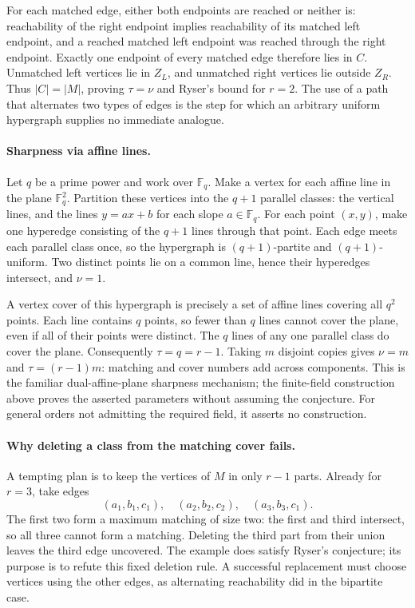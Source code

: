 \documentclass[11pt,a4paper]{article}
\begin{document}
For each matched edge, either both endpoints are reached or neither
is: reachability of the right endpoint implies reachability of its
matched left endpoint, and a reached matched left endpoint was reached
through the right endpoint. Exactly one endpoint of every matched edge
therefore lies in $C$. Unmatched left vertices lie in $Z_L$, and
unmatched right vertices lie outside $Z_R$. Thus $|C|=|M|$, proving
$\tau=\nu$ and Ryser's bound for $r=2$. The use of a path that alternates
two types of edges is the step for which an arbitrary uniform
hypergraph supplies no immediate analogue.

\paragraph{Sharpness via affine lines.}
Let $q$ be a prime power and work over $\mathbb F_q$. Make a vertex for
each affine line in the plane $\mathbb F_q^2$. Partition these vertices
into the $q+1$ parallel classes: the vertical lines, and the lines
$y=ax+b$ for each slope $a\in\mathbb F_q$. For each point $(x,y)$, make
one hyperedge consisting of the $q+1$ lines through that point. Each
edge meets each parallel class once, so the hypergraph is
$(q+1)$-partite and $(q+1)$-uniform. Two distinct points lie on a common
line, hence their hyperedges intersect, and $\nu=1$.

A vertex cover of this hypergraph is precisely a set of affine lines
covering all $q^2$ points. Each line contains $q$ points, so fewer than
$q$ lines cannot cover the plane, even if all of their points were
distinct. The $q$ lines of any one parallel class do cover the plane.
Consequently $\tau=q=r-1$. Taking $m$ disjoint copies gives
$\nu=m$ and $\tau=(r-1)m$: matching and cover numbers add across
components. This is the familiar dual-affine-plane sharpness mechanism;
the finite-field construction above proves the asserted parameters
without assuming the conjecture. For general orders not admitting the
required field, it asserts no construction.

\paragraph{Why deleting a class from the matching cover fails.}
A tempting plan is to keep the vertices of $M$ in only $r-1$ parts.
Already for $r=3$, take edges
\[
 (a_1,b_1,c_1),\quad(a_2,b_2,c_2),\quad(a_3,b_3,c_1).
\]
The first two form a maximum matching of size two: the first and third
intersect, so all three cannot form a matching. Deleting the third
part from their union leaves the third edge uncovered. The example
does satisfy Ryser's conjecture; its purpose is to refute this fixed
deletion rule. A successful replacement must choose vertices using
the other edges, as alternating reachability did in the bipartite case.
\end{document}
